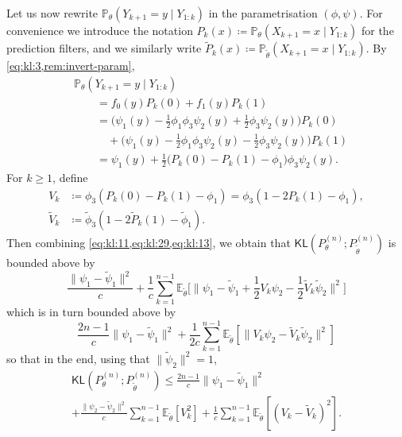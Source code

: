 \documentclass[journal]{IEEEtran}
\newcommand{\1}{\boldsymbol{1}}
\newcommand{\EE}{\mathbb{E}}
\newcommand{\PP}{\mathbb{P}}
\newcommand{\KL}{\mathsf{KL}}
\begin{document}
  Let us now rewrite $\PP_{\theta}(Y_{k+1} = y \mid Y_{1:k})$ in the
  parametrisation $(\phi,\psi)$. For convenience we introduce the notation
  $P_k(x) \coloneqq \PP_{\theta}(X_{k+1} = x \mid Y_{1:k} )$ for the prediction
  filters, and we similarly write
  $\tilde{P}_k(x) \coloneqq \PP_{\tilde{\theta}}(X_{k+1} = x \mid Y_{1:k} )$. By
  \cref{eq:kl:3,rem:invert-param},
  \begin{align*}
	&\PP_{\theta}(Y_{k+1} = y \mid Y_{1:k})\\%
	&\qquad= f_0(y) P_k(0) + f_1(y)P_k(1)\\
	&\qquad= \Big(\psi_1(y) - \tfrac{1}{2}\phi_1\phi_3\psi_2(y) + \tfrac{1}{2}\phi_3\psi_2(y)  \Big)P_k(0)\\%
	&\qquad\quad%
   + \Big(\psi_1(y) - \tfrac{1}{2}\phi_1\phi_3\psi_2(y) - \tfrac{1}{2}\phi_3\psi_2(y)  \Big)P_k(1)\\
	&\qquad= \psi_1(y) + \tfrac{1}{2}\big(P_k(0) - P_k(1) - \phi_1 \big)\phi_3\psi_2(y).
  \end{align*}
  For $k\geq 1$, define
  \begin{align*}
	V_k
	&\coloneqq%
   \phi_3(P_k(0) - P_k(1) - \phi_1)%
    = \phi_3(1 - 2P_k(1) - \phi_1),\\%
    \tilde{V}_k&\coloneqq \tilde{\phi}_3(1-2\tilde{P}_k(1)-\tilde{\phi}_1).
  \end{align*}
  Then combining \cref{eq:kl:11,eq:kl:29,eq:kl:13}, we obtain that $\KL(P_{\theta}^{(n)};P_{\tilde{\theta}}^{(n)})$ is bounded above by
  \begin{equation*}
    \frac{\|\psi_1 - \tilde{\psi}_1\|^2}{c}%
   + \frac{1}{c}\sum_{k=1}^{n-1}\EE_{\tilde{\theta}}%
   \Big[\Big\|\psi_1 - \tilde{\psi}_1 + \frac{1}{2}V_k \psi_2 - \frac{1}{2}\tilde{V}_k\tilde{\psi}_2 \Big\|^2 \Big]
 \end{equation*}
 which is in turn bounded above by
 \begin{equation*}
   \frac{2n-1}{c}\|\psi_1 - \tilde{\psi}_1\|^2%
   + \frac{1}{2c}\sum_{k=1}^{n-1}\EE_{\tilde{\theta}}[\|V_k\psi_2 - \tilde{V}_k\tilde{\psi}_2\|^2]
 \end{equation*}
 so that in the end, using that $\|\tilde{\psi}_2\|^2 = 1$,
  \begin{multline}
    \label{eq:kl:39}
    \KL(P_{\theta}^{(n)};P_{\tilde{\theta}}^{(n)})
	\leq \frac{2n-1}{c}\|\psi_1 - \tilde{\psi}_1\|^2\\%
   + \frac{\|\psi_2 - \tilde{\psi}_2\|^2}{c}\sum_{k=1}^{n-1}\EE_{\tilde{\theta}}[V_k^2]%
   + \frac{1}{c}\sum_{k=1}^{n-1}\EE_{\tilde{\theta}}[(V_k - \tilde{V}_k)^2].
  \end{multline}
\end{document}
